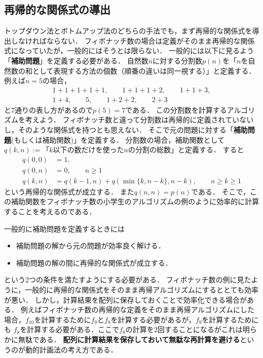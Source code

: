 \documentclass[a4paper,twoside,onecolumn,openany,article]{memoir}
\theoremstyle{remark}
\begin{document}
\begin{comment}
実際には大きな数2つだけ覚えておけばよいので，次のように簡略化できる．
\begin{lstlisting}[basicstyle=\ttfamily\small,showstringspaces=false,language=C,frame=single]
int fib(int n){
  int i, x, y;
// n が0以下の場合はエラー
  if(n <= 0) return -1;
  x = y = 1;
  for(i = 0; i < n - 2; i++){
    int tmp;
    tmp = y;
    y = x + y;
    x = tmp;
  }
  return y;
}
\end{lstlisting}
ここで\texttt{y}は今まで計算した一番大きいフィボナッチ数，
\texttt{x}は今まで計算した二番目に大きいフィボナッチ数を保存してある変数である．
\end{comment}

\subsection{再帰的な関係式の導出}
トップダウン法とボトムアップ法のどちらの手法でも，まず再帰的な関係式を導出しなければならない．
フィボナッチ数の場合は定義がそのまま再帰的な関係式になっていたが，一般的にはそうとは限らない．
一般的には以下に見るよう「\textbf{補助問題}」を定義する必要がある．
自然数$n$に対する分割数$p(n)$を「$n$を自然数の和として表現する方法の個数（順番の違いは同一視する）」と定義する．
例えば$n=5$の場合，
\begin{align*}
1+1+1+1+1,\qquad 1+1+1+2,\qquad 1+1+3,\\
1+4,\qquad 5,\qquad 1+2+2,\qquad 2+3
\end{align*}
と7通りの表し方があるので$p(5)=7$である．
この分割数を計算するアルゴリズムを考えよう．
フィボナッチ数と違って分割数は再帰的に定義されていないし，そのような関係式を持つとも思えない．
そこで元の問題に対する「\textbf{補助問題}(もしくは補助関数)」を定義する．
分割数の場合，補助関数として$q(k,n):=\text{「$k$以下の数だけを使った$n$の分割の総数」}$と定義する．
すると
\begin{align*}
q(0,0) &= 1,\\
q(0,n) &= 0,\qquad n \ge 1\\
q(k,n) &= q(k-1,n) + q(\min\{k, n-k\}, n-k),\qquad n\ge k\ge 1
\end{align*}
という再帰的な関係式が成立する．
また$q(n,n)=p(n)$である．
そこで，この補助関数をフィボナッチ数の小学生のアルゴリズムの例のように効率的に計算することを考えるのである．

一般的に補助問題を定義するときには
\begin{itemize}
\item 補助問題の解から元の問題が効率良く解ける．
\item 補助問題の解の間に再帰的な関係式が成立する．
\end{itemize}
という2つの条件を満たすようにする必要がある．
フィボナッチ数の例に見たように，一般的に再帰的な関係式をそのまま再帰アルゴリズムにするととても効率が悪い．
しかし，計算結果を配列に保存しておくことで効率化できる場合がある．
例えばフィボナッチ数の再帰的な定義をそのまま再帰アルゴリズムにした場合，$f_{10}$を計算するために$f_9$と$f_8$を計算する必要があるが，$f_9$を計算するためにも
$f_8$を計算する必要がある．ここで$f_8$の計算を2回することになるがこれは明らかに無駄である．
\textbf{配列に計算結果を保存しておいて無駄な再計算を避ける}というのが動的計画法の考え方である．
\end{document}
